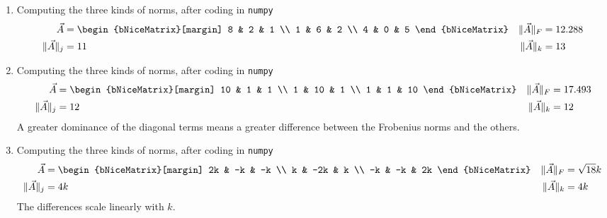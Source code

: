 \begin{enumerate}
    \item Computing the three kinds of norms, after coding in \texttt{numpy}
          \begin{align}
              \vec{A}                 & = \begin{bNiceMatrix}[margin]
                                              8 & 2 & 1 \\
                                              1 & 6 & 2 \\
                                              4 & 0 & 5
                                          \end{bNiceMatrix} &
              \lVert \vec{A} \rVert_F & = 12.288                        \\
              \lVert \vec{A} \rVert_j & = 11                          &
              \lVert \vec{A} \rVert_k & = 13
          \end{align}

    \item Computing the three kinds of norms, after coding in \texttt{numpy}
          \begin{align}
              \vec{A}                 & = \begin{bNiceMatrix}[margin]
                                              10 & 1  & 1  \\
                                              1  & 10 & 1  \\
                                              1  & 1  & 10
                                          \end{bNiceMatrix} &
              \lVert \vec{A} \rVert_F & = 17.493                        \\
              \lVert \vec{A} \rVert_j & = 12                          &
              \lVert \vec{A} \rVert_k & = 12
          \end{align}
          A greater dominance of the diagonal terms means a greater difference between
          the Frobenius norms and the others.

    \item Computing the three kinds of norms, after coding in \texttt{numpy}
          \begin{align}
              \vec{A}                 & = \begin{bNiceMatrix}[margin]
                                              2k & -k  & -k \\
                                              k  & -2k & k  \\
                                              -k & -k  & 2k
                                          \end{bNiceMatrix} &
              \lVert \vec{A} \rVert_F & = \sqrt{18} k                   \\
              \lVert \vec{A} \rVert_j & = 4k                          &
              \lVert \vec{A} \rVert_k & = 4k
          \end{align}
          The differences scale linearly with $ k $.
\end{enumerate}
